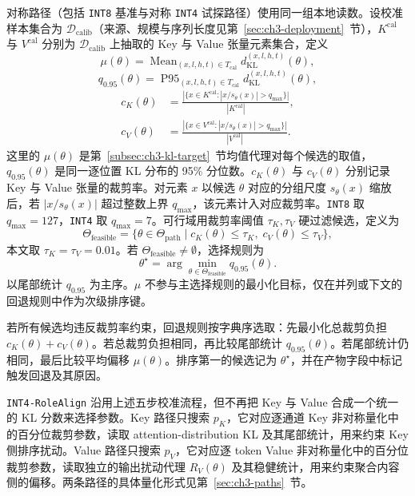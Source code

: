 对称路径（包括 \texttt{INT8} 基准与对称 \texttt{INT4} 试探路径）使用同一组本地读数。设校准样本集合为 $\mathcal D_{\mathrm{calib}}$（来源、规模与序列长度见第~\ref{sec:ch3-deployment}~节），$K^{\mathrm{cal}}$ 与 $V^{\mathrm{cal}}$ 分别为 $\mathcal D_{\mathrm{calib}}$ 上抽取的 Key 与 Value 张量元素集合，定义
\begin{equation}
\mu(\theta)
=
\operatorname{Mean}_{(x,l,h,t)\in T_{\mathrm{cal}}}
d_{\mathrm{KL}}^{(x,l,h,t)}(\theta),
\end{equation}
\begin{equation}
\label{eq:ch3-q95}
q_{0.95}(\theta)
=
\operatorname{P95}_{(x,l,h,t)\in T_{\mathrm{cal}}}
d_{\mathrm{KL}}^{(x,l,h,t)}(\theta),
\end{equation}
\begin{align}
c_K(\theta) &= \frac{|\{x\in K^{\mathrm{cal}}: |x/s_\theta(x)| > q_{\max}\}|}{|K^{\mathrm{cal}}|}, \\
c_V(\theta) &= \frac{|\{x\in V^{\mathrm{cal}}: |x/s_\theta(x)| > q_{\max}\}|}{|V^{\mathrm{cal}}|}.
\end{align}
这里的 $\mu(\theta)$ 是第~\ref{subsec:ch3-kl-target}~节均值代理对每个候选的取值，$q_{0.95}(\theta)$ 是同一逐位置 KL 分布的 95\% 分位数。$c_K(\theta)$ 与 $c_V(\theta)$ 分别记录 Key 与 Value 张量的裁剪率。对元素 $x$ 以候选 $\theta$ 对应的分组尺度 $s_\theta(x)$ 缩放后，若 $|x/s_\theta(x)|$ 超过整数上界 $q_{\max}$，该元素计入对应裁剪率。\texttt{INT8} 取 $q_{\max}=127$，\texttt{INT4} 取 $q_{\max}=7$。可行域用裁剪率阈值 $\tau_K,\tau_V$ 硬过滤候选，定义为
\begin{equation}
\Theta_{\mathrm{feasible}}
=
\{\theta \in \Theta_{\mathrm{path}}\mid c_K(\theta)\le \tau_K,\; c_V(\theta)\le \tau_V\},
\end{equation}
本文取 $\tau_K = \tau_V = 0.01$。若 $\Theta_{\mathrm{feasible}}\neq\emptyset$，选择规则为
\begin{equation}
\theta^\star
=
\arg\min_{\theta \in \Theta_{\mathrm{feasible}}}
q_{0.95}(\theta).
\end{equation}
以尾部统计 $q_{0.95}$ 为主序。$\mu$ 不参与主选择规则的最小化目标，仅在并列或下文的回退规则中作为次级排序键。

若所有候选均违反裁剪率约束，回退规则按字典序选取：先最小化总裁剪负担 $c_K(\theta)+c_V(\theta)$。若总裁剪负担相同，再比较尾部统计 $q_{0.95}(\theta)$。若尾部统计仍相同，最后比较平均偏移 $\mu(\theta)$。排序第一的候选记为 $\theta^\star$，并在产物字段中标记触发回退及其原因。

\texttt{INT4-RoleAlign} 沿用上述五步校准流程，但不再把 Key 与 Value 合成一个统一的 KL 分数来选择参数。Key 路径只搜索 $p_K$，它对应逐通道 Key 非对称量化中的百分位裁剪参数，读取 attention-distribution KL 及其尾部统计，用来约束 Key 侧排序扰动。Value 路径只搜索 $p_V$，它对应逐 token Value 非对称量化中的百分位裁剪参数，读取独立的输出扰动代理 $R_V(\theta)$ 及其稳健统计，用来约束聚合内容侧的偏移。两条路径的具体量化形式见第~\ref{sec:ch3-paths}~节。

